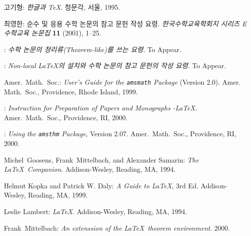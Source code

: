 \documentclass[a4paper,10pt]{amsproc}
\begin{document}

\begin{thebibliography}{99}
고기형: \emph{한글과 \TeX}. 청문각, 서울, 1995.

최영한: 순수 및 응용 수학 논문의 참고 문헌 작성 요령.
  \emph{한국수학교육학회지 시리즈 E 수학교육 논문집} \textbf{11} (2001),
  1--25.

{\bysame}: \emph{수학 논문의 정리류(Theorem-like)를 쓰는 요령}.
  To Appear.

{\bysame}: \emph{Non-local \LaTeX 의 설치와 수학 논문의 참고 문헌의
  작성 요령}. To Appear.

  Amer.~Math.~Soc.: \emph{User's Guide for the \texttt{amsmath}
  Package} (Version 2.0). {Amer. Math.~Soc.}, Providence, Rhode
  Island, 1999. 

\bysame: \emph{Instruction for Preparation of Papers and
  Monographs \AmS-\LaTeX}. {Amer.\ Math.\ Soc.}, Providence,
  RI, 2000. 

\bysame: \emph{Using the \texttt{amsthm} Package}, Version 2.07.
  {Amer.\ Math.\ Soc.}, Providence, RI, 2000. 

  Michel~Goosens, Frank~Mittelbach, and Alexander Samarin: \emph{The
  \LaTeX~Companion}. {Ad\-di\-son-Wes\-ley}, Reading, MA, 1994.

  Helmut Kopka and Patrick W. Daly: \emph{A Guide to \LaTeX},
  3rd Ed. {Ad\-di\-son-Wes\-ley}, Reading, MA, 1999.

  Leslie Lambert: \emph{\LaTeX}. {Ad\-di\-son-Wes\-ley}, Reading,
  MA, 1994.

  Frank~Mittelbach: \emph{An extenssion of the \LaTeX~theorem
  environment}. 2000. 
\end{thebibliography}
\end{document}
